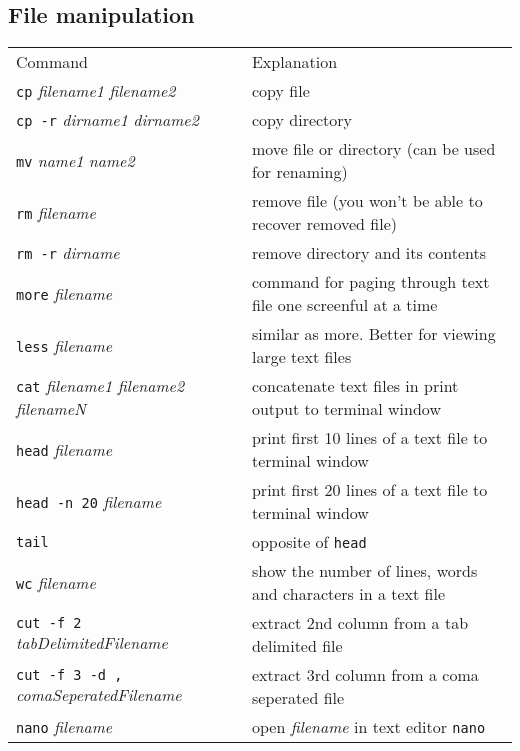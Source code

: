 \subsection{File manipulation}
\begin{tabular}{ll}
  Command & Explanation \\
  \hhline{==}
  \texttt{cp} \textit{filename1} \textit{filename2} & copy file \\
  \texttt{cp -r} \textit{dirname1} \textit{dirname2} & copy directory \\
  \texttt{mv} \textit{name1} \textit{name2} & move file or directory (can be used for renaming) \\
  \texttt{rm} \textit{filename} & remove file (you won't be able to recover removed file) \\
  \texttt{rm -r} \textit{dirname} & remove directory and its contents \\
  \texttt{more} \textit{filename} & command for paging through text file one screenful at a time \\
  \texttt{less} \textit{filename} & similar as more. Better for viewing large text files \\
  \texttt{cat} \textit{filename1 filename2 filenameN} & concatenate text files in print output to terminal window \\
  \texttt{head} \textit{filename} & print first 10 lines of a text file to terminal window \\
  \texttt{head -n 20} \textit{filename} &  print first 20 lines of a text file to terminal window \\
  \texttt{tail} & opposite of \texttt{head} \\
  \texttt{wc} \textit{filename} & show the number of lines, words and characters in a text file \\
  \texttt{cut -f 2} \textit{tabDelimitedFilename} & extract 2nd column from a tab delimited file \\
  \texttt{cut -f 3 -d ,} \textit{comaSeperatedFilename} & extract 3rd column from a coma seperated file \\
  \texttt{nano} \textit{filename} & open \textit{filename} in text editor \texttt{nano} \\
\end{tabular}

